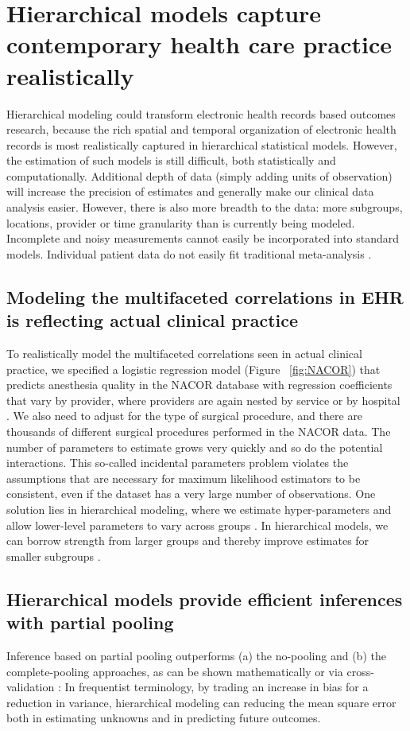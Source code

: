\documentclass[11pt,notitlepage]{article}
\begin{document}
\section*{Hierarchical models capture contemporary health care practice realistically}
Hierarchical modeling could transform electronic health records based 
outcomes research, because the rich spatial and temporal 
organization of electronic health records is most realistically 
captured in hierarchical statistical models. However, the estimation of such models
is still difficult, both statistically and computationally.  
Additional depth of data (simply adding units of observation) will increase 
the precision of estimates and generally make our clinical data analysis easier. 
However, there is also more breadth to the data: 
more subgroups, locations, provider or time granularity than is currently 
being modeled. Incomplete and noisy measurements cannot easily be incorporated into standard models.
Individual patient data do not easily fit traditional meta-analysis
\cite{Andreae2015,Andreae2012}.

\subsection*{Modeling the multifaceted correlations in EHR is reflecting actual clinical practice}
To realistically model the multifaceted correlations seen in actual clinical 
practice, we specified a logistic regression model  (Figure~ \ref{fig:NACOR}) 
that predicts anesthesia quality in the NACOR database
with regression coefficients that vary by provider, where providers 
are again nested by service or by hospital 
\cite{AndreaeWhite2015}. We also need to adjust for the type of surgical procedure, and there are 
thousands of different surgical procedures performed in the NACOR data. The number 
of parameters to estimate grows very quickly and so do the potential interactions. This so-called
incidental parameters problem violates the assumptions that are necessary for maximum likelihood
estimators to be consistent, even if the dataset has a very large number of observations.
One solution lies in hierarchical modeling, where we estimate hyper-parameters and allow
lower-level parameters to vary across groups \cite{Bafumi_Gelman_2007}. 
In hierarchical models, we can borrow strength from larger groups and thereby improve estimates for 
smaller subgroups \cite{ParkGelman2004bayesian}.

\subsection*{Hierarchical models provide efficient inferences with partial pooling}
Inference based on partial pooling outperforms (a) the no-pooling and (b) the 
complete-pooling approaches, as can be shown mathematically \cite{Efron_1975} 
or via cross-validation \cite{Gelman-Hill_2014}: In frequentist terminology, by trading an increase in 
bias for a reduction in variance, hierarchical modeling can reducing the mean square error both
in estimating unknowns and in predicting future outcomes.
\end{document}
